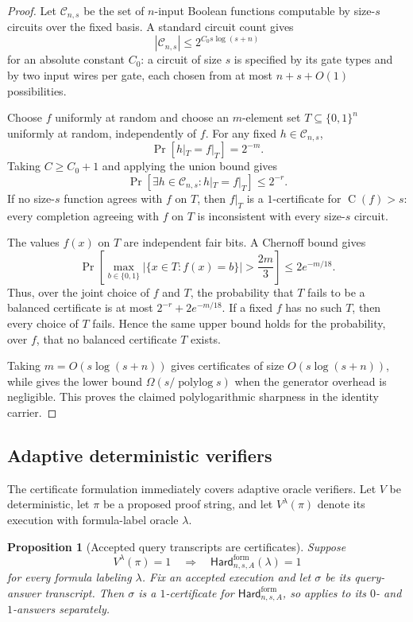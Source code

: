 \documentclass[11pt]{article}
\newtheorem{proposition}[theorem]{Proposition}
\theoremstyle{definition}
\newcommand{\bits}{\{0,1\}}
\newcommand{\Ckt}{\operatorname{C}}
\newcommand{\polylog}{\operatorname{polylog}}
\newcommand{\HardF}{\mathsf{Hard}^{\mathrm{form}}}
\begin{document}
\begin{proof}
Let \(\mathcal C_{n,s}\) be the set of \(n\)-input Boolean functions computable by size-\(s\) circuits over the fixed basis.  A standard circuit count gives
\[
  |\mathcal C_{n,s}|\le 2^{C_0s\log(s+n)}
\]
for an absolute constant \(C_0\): a circuit of size \(s\) is specified by its gate types and by two input wires per gate, each chosen from at most \(n+s+O(1)\) possibilities.

Choose \(f\) uniformly at random and choose an \(m\)-element set \(T\subseteq\bits^n\) uniformly at random, independently of \(f\).  For any fixed \(h\in\mathcal C_{n,s}\),
\[
  \Pr[h|_T=f|_T]=2^{-m}.
\]
Taking \(C\ge C_0+1\) and applying the union bound gives
\[
  \Pr[\exists h\in\mathcal C_{n,s}:h|_T=f|_T]\le 2^{-r}.
\]
If no size-\(s\) function agrees with \(f\) on \(T\), then \(f|_T\) is a \(1\)-certificate for \(\Ckt(f)>s\): every completion agreeing with \(f\) on \(T\) is inconsistent with every size-\(s\) circuit.

The values \(f(x)\) on \(T\) are independent fair bits.  A Chernoff bound gives
\[
  \Pr\left[
    \max_{b\in\bits}|\{x\in T:f(x)=b\}|>\frac{2m}{3}
  \right]
  \le 2e^{-m/18}.
\]
Thus, over the joint choice of \(f\) and \(T\), the probability that \(T\) fails to be a balanced certificate is at most \(2^{-r}+2e^{-m/18}\).  If a fixed \(f\) has no such \(T\), then every choice of \(T\) fails.  Hence the same upper bound holds for the probability, over \(f\), that no balanced certificate \(T\) exists.

Taking \(m=O(s\log(s+n))\) gives certificates of size \(O(s\log(s+n))\), while  gives the lower bound \(\Omega(s/\polylog s)\) when the generator overhead is negligible.  This proves the claimed polylogarithmic sharpness in the identity carrier.
\end{proof}

\subsection{Adaptive deterministic verifiers}

The certificate formulation immediately covers adaptive oracle verifiers.  Let $V$ be deterministic, let $\pi$ be a proposed proof string, and let $V^\lambda(\pi)$ denote its execution with formula-label oracle $\lambda$.

\begin{proposition}[Accepted query transcripts are certificates]\label{prop:adaptive-formula}
Suppose
\[
  V^\lambda(\pi)=1
  \quad\Longrightarrow\quad
  \HardF_{n,s,A}(\lambda)=1
\]
for every formula labeling $\lambda$.  Fix an accepted execution and let $\sigma$ be its query-answer transcript.  Then $\sigma$ is a $1$-certificate for $\HardF_{n,s,A}$, so  applies to its $0$- and $1$-answers separately.
\end{proposition}
\end{document}
